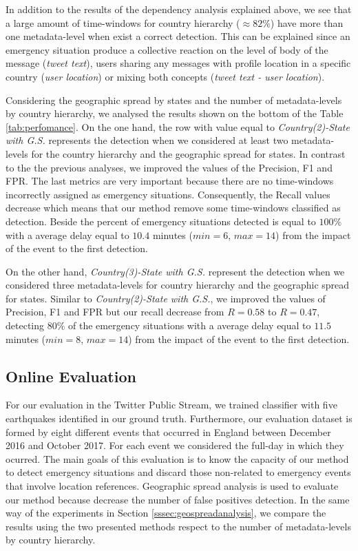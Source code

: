 \documentclass[sigconf]{acmart}
\begin{document}
In addition to the results of the dependency analysis explained above, we see that a large amount of time-windows for country hierarchy ($\approx 82\%$) have more than one metadata-level when exist a correct detection. This can be explained since an emergency situation produce a collective reaction on the level of body of the message (\textit{tweet text}), users sharing any messages with profile location in a specific country (\textit{user location}) or mixing both concepts (\textit{tweet text - user location}).


Considering the geographic spread by states and the number of metadata-levels by country hierarchy, we analysed the results shown on the bottom of the Table \ref{tab:perfomance}. On the one hand, the row with value equal to \textit{Country(2)-State with G.S.} represents the detection when we considered at least two metadata-levels for the country hierarchy and the geographic spread for states. In contrast to the the previous analyses, we improved the values of the Precision, F1 and FPR. The last metrics are very important because there are no time-windows incorrectly assigned as emergency situations. Consequently, the Recall values decrease which means that our method remove some time-windows classified as detection. Beside the percent of emergency situations detected is equal to $100\%$ with a average delay equal to $10.4$ minutes ($min=6$, $max=14$) from the impact of the event to the first detection.


On the other hand, \textit{Country(3)-State with G.S.} represent the detection when we considered three metadata-levels for country hierarchy and the geographic spread for states. Similar to  \textit{Country(2)-State with G.S.}, we improved the values of Precision, F1 and FPR but our recall decrease from $R = 0.58$ to $R = 0.47$, detecting  $80\%$ of the emergency situations with a average delay equal to $11.5$ minutes ($min=8$, $max=14$) from the impact of the event to the first detection.




\subsection{Online Evaluation}
For our evaluation in the Twitter Public Stream, we trained classifier with five earthquakes identified in our ground truth. Furthermore, our evaluation dataset is formed by eight different events that occurred in England between December 2016 and October 2017. For each event we considered the full-day in which they ocurred. The main goals of this evaluation is to know the capacity of our method to detect emergency situations and discard those non-related to emergency events that involve location references. Geographic spread analysis is used to evaluate our method because decrease the number of false positives detection. In the same way of the experiments in Section \ref{sssec:geospreadanalysis}, we compare the results using the two presented methods respect to the number of metadata-levels by country hierarchy.
\end{document}
